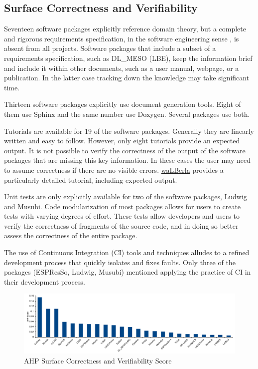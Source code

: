 \documentclass[final, 3p, times, authoryear]{elsarticle}
\begin{document}
\subsection{Surface Correctness and Verifiability} \label{SecSurfCorrectAndVerifiab}

Seventeen software packages explicitly reference domain theory, but a complete
and rigorous requirements specification, in the software engineering sense
\citep{IEEE1998, RobertsonAndRobertson1999Vol, ESA1991},  is absent from all
projects. Software packages that include a subset of a requirements
specification, such as DL\_MESO (LBE), keep the information brief and include it
within other documents, such as a user manual, webpage, or a publication. In the
latter case tracking down the knowledge may take significant time. 

Thirteen software packages explicitly use document generation tools. Eight of
them use Sphinx and the same number use Doxygen. Several packages use both.

Tutorials are available for 19 of the software packages. Generally they are
linearly written and easy to follow. However, only eight tutorials provide an
expected output. It is not possible to verify the correctness of the output of
the software packages that are missing this key information. In these cases the
user may need to assume correctness if there are no visible errors.
\href{https://www.walberla.net/doxygen/index.html} {waLBerla} provides a
particularly detailed tutorial, including expected output.

Unit tests are only explicitly available for two of the software packages,
Ludwig and Musubi. Code modularization of most packages allows for users to
create tests with varying degrees of effort. These tests allow developers and
users to verify the correctness of fragments of the source code, and in doing so
better assess the correctness of the entire package.

The use of Continuous Integration (CI) tools and techniques alludes to a refined
development process that quickly isolates and fixes faults. Only three of the
packages (ESPResSo, Ludwig, Musubi) mentioned applying the practice of CI in
their development process.

\begin{figure}[h!]
	\begin{center}
		\includegraphics[width=1.0\textwidth]{./figures/correctnessverifiability.pdf}
		\caption{AHP Surface Correctness and Verifiability Score}
		\label{Fig_CorrectnessVerifiability}
	\end{center}
\end{figure}
\end{document}
